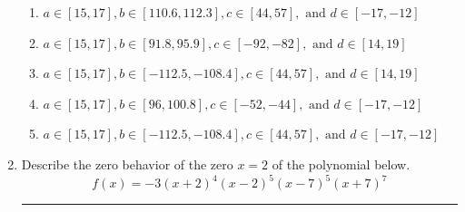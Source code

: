 \documentclass[14pt]{extbook}
\newcommand{\litem}[1]{\item#1\hspace*{-1cm}\rule{\textwidth}{0.4pt}}
\begin{document}
\begin{enumerate}
{\begin{enumerate}[label=\Alph*.]
\item \( a \in [15, 17], b \in [110.6, 112.3], c \in [44, 57], \text{ and } d \in [-17, -12] \)
\item \( a \in [15, 17], b \in [91.8, 95.9], c \in [-92, -82], \text{ and } d \in [14, 19] \)
\item \( a \in [15, 17], b \in [-112.5, -108.4], c \in [44, 57], \text{ and } d \in [14, 19] \)
\item \( a \in [15, 17], b \in [96, 100.8], c \in [-52, -44], \text{ and } d \in [-17, -12] \)
\item \( a \in [15, 17], b \in [-112.5, -108.4], c \in [44, 57], \text{ and } d \in [-17, -12] \)

\end{enumerate} }
\litem{
Describe the zero behavior of the zero $x = 2$ of the polynomial below.\[ f(x) = -3(x + 2)^{4}(x - 2)^{5}(x - 7)^{5}(x + 7)^{7} \]\begin{enumerate}[label=\Alph*.]

\end{enumerate}}
\end{enumerate}
\end{document}
